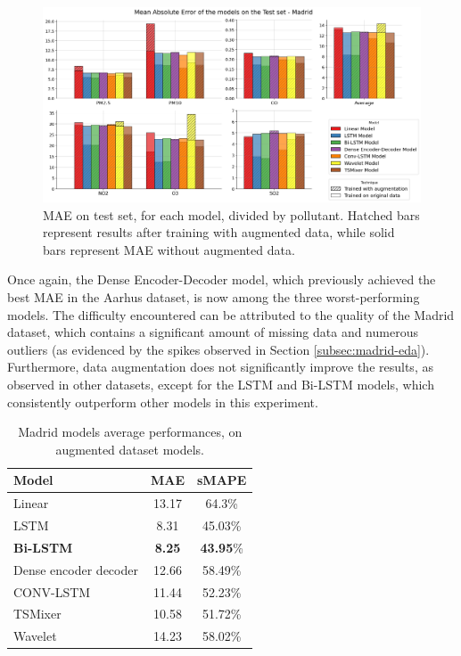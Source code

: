 \begin{figure}[h]
    \centering
    \includegraphics[width=1\linewidth]{images/Results/Madrid_results.png}
    \caption{MAE on test set, for each model, divided by pollutant. Hatched bars represent results after training with augmented data, while solid bars represent MAE without augmented data.}
    \label{fig:madrid_results}
\end{figure}

Once again, the Dense Encoder-Decoder model, which previously achieved the best MAE in the Aarhus dataset, is now among the three worst-performing models.
The difficulty encountered can be attributed to the quality of the Madrid dataset, which contains a significant amount of missing data and numerous outliers (as evidenced by the spikes observed in Section \ref{subsec:madrid-eda}). Furthermore, data augmentation does not significantly improve the results, as observed in other datasets, except for the LSTM and Bi-LSTM models, which consistently outperform other models in this experiment.

\begin{table}[]
    \centering
    \begin{tabular}{lcc}
        \toprule
        \textbf{Model} & \textbf{MAE} & \textbf{sMAPE} \\ 
        \midrule
        Linear & 13.17 & 64.3\% \\
        LSTM & 8.31 & 45.03\% \\
       \textbf{Bi-LSTM}& \textbf{8.25} & \textbf{43.95}\% \\
        Dense encoder decoder & 12.66 & 58.49\% \\
        CONV-LSTM & 11.44 & 52.23\% \\
        TSMixer & 10.58 & 51.72\% \\
        Wavelet & 14.23 & 58.02\% \\ 
        \bottomrule
    \end{tabular}
    \caption{Madrid models average performances, on augmented dataset models.}
    \label{tab:Madrid_performances}
\end{table}

